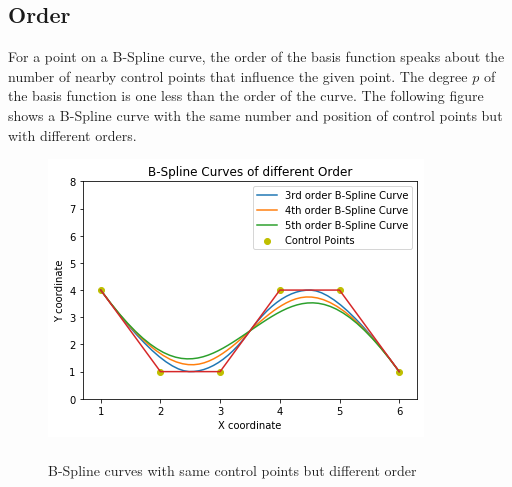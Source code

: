 \documentclass[11pt]{article}
\begin{document}
\subsection{Order }
For a point on a B-Spline curve, the order of the basis function speaks about the number of nearby control points that influence the given point. The degree $p$ of the basis function is one less than the order of the curve. The following figure shows a B-Spline curve with the same number and position of control points but with different orders.
\begin{figure}[H]
	\begin{center}
		\includegraphics[scale=0.8]{DegreeBspline.png} 
		\caption{\\B-Spline curves with same control points but different order}\label{DegreeBspline}
	\end{center}	
\end{figure}
\end{document}
